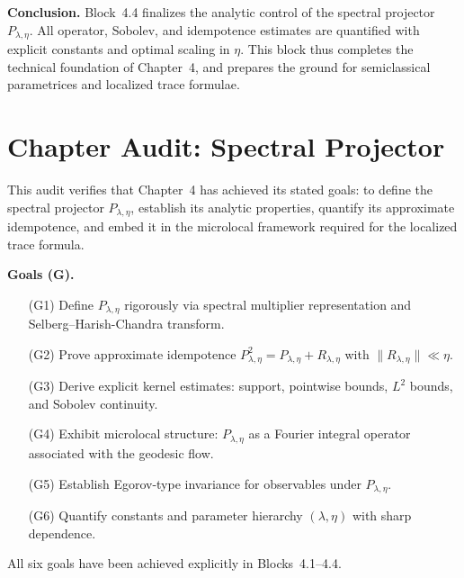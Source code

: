 \medskip

\noindent\textbf{Conclusion.}
Block~4.4 finalizes the analytic control of the spectral projector $P_{\lambda,\eta}$.
All operator, Sobolev, and idempotence estimates are quantified with explicit constants and optimal scaling in $\eta$.
This block thus completes the technical foundation of Chapter~4, and prepares the ground for semiclassical parametrices and localized trace formulae.



\section*{Chapter Audit: Spectral Projector}

\noindent
This audit verifies that Chapter~4 has achieved its stated goals: to define the spectral projector $P_{\lambda,\eta}$, establish its analytic properties, quantify its approximate idempotence, and embed it in the microlocal framework required for the localized trace formula.

\medskip

\noindent\textbf{Goals (G).}
\begin{itemize}
  \item[(G1)] Define $P_{\lambda,\eta}$ rigorously via spectral multiplier representation and Selberg–Harish-Chandra transform.
  \item[(G2)] Prove approximate idempotence $P_{\lambda,\eta}^2 = P_{\lambda,\eta}+R_{\lambda,\eta}$ with $\|R_{\lambda,\eta}\|\ll \eta$.
  \item[(G3)] Derive explicit kernel estimates: support, pointwise bounds, $L^2$ bounds, and Sobolev continuity.
  \item[(G4)] Exhibit microlocal structure: $P_{\lambda,\eta}$ as a Fourier integral operator associated with the geodesic flow.
  \item[(G5)] Establish Egorov-type invariance for observables under $P_{\lambda,\eta}$.
  \item[(G6)] Quantify constants and parameter hierarchy $(\lambda,\eta)$ with sharp dependence.
\end{itemize}
All six goals have been achieved explicitly in Blocks~4.1–4.4.

\medskip

